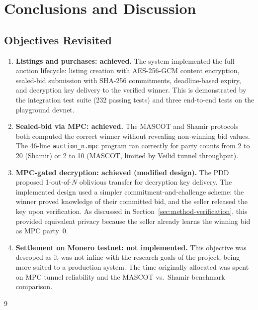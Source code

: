 
\section{Conclusions and Discussion}
\label{sec:conclusions}

\subsection{Objectives Revisited}
\label{sec:conc-objectives}

\begin{enumerate}
  \item \textbf{Listings and purchases: achieved.}  The system implemented
    the full auction lifecycle: listing creation with AES-256-GCM content
    encryption, sealed-bid submission with SHA-256 commitments, deadline-based
    expiry, and decryption key delivery to the verified winner.  This is
    demonstrated by the integration test suite (232 passing tests) and three
    end-to-end tests on the playground devnet.

  \item \textbf{Sealed-bid via MPC: achieved.}  The MASCOT and Shamir
    protocols both computed the correct winner without revealing non-winning
    bid values.  The 46-line \texttt{auction\_n.mpc} program ran correctly
    for party counts from 2 to 20 (Shamir) or 2 to 10 (MASCOT, limited by
    Veilid tunnel throughput).

  \item \textbf{MPC-gated decryption: achieved (modified design).}  The
    PDD proposed 1-out-of-$N$ oblivious transfer for decryption key delivery.
    The implemented design used a simpler commitment-and-challenge scheme:
    the winner proved knowledge of their committed bid, and the seller
    released the key upon verification.  As discussed in
    Section~\ref{sec:method-verification}, this provided equivalent privacy
    because the seller already learns the winning bid as MPC party~0.

  \item \textbf{Settlement on Monero testnet: not implemented.}  This
    objective was descoped as it was not inline with the research goals of
    the project, being more suited to a production system.  The time
    originally allocated was spent on MPC tunnel reliability and the MASCOT
    vs.\ Shamir benchmark comparison.
\end{enumerate}
9
